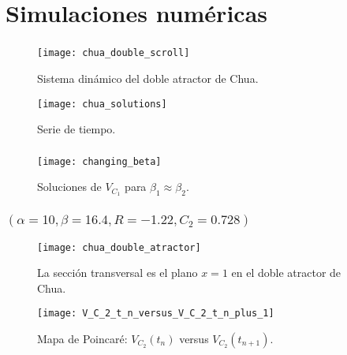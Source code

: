 \section{Simulaciones numéricas}

\begin{frame}
	\frametitle{\secname}

	\begin{minipage}{0.45\textwidth}
		\begin{figure}[ht!]
			\centering
			\texttt{[image: chua\_double\_scroll]}
			\caption{Sistema dinámico del doble atractor de Chua.}\label{fig:chua_double_scroll}
		\end{figure}
	\end{minipage}
	\begin{minipage}{0.45\textwidth}
		\begin{figure}[ht!]
			\centering
			\texttt{[image: chua\_solutions]}
			\caption{Serie de tiempo.}\label{fig:chua_solutions}
		\end{figure}
	\end{minipage}
\end{frame}

\begin{frame}
	\frametitle{\secname} %

	\begin{figure}[ht!]
		\centering
		\texttt{[image: changing\_beta]}
		\caption{Soluciones de $V_{C_{1}}$ para $\beta_{1}\approx\beta_{2}$.}\label{fig:changing_beta}
	\end{figure}

\end{frame}

\begin{frame}
	\frametitle{\secname\quad$\left(\alpha=10,\beta=16.4,R=-1.22,C_{2}=0.728\right)$}

	\begin{minipage}{0.45\textwidth}
		\begin{figure}[ht!]
			\centering
			\texttt{[image: chua\_double\_atractor]}
			\caption{La sección transversal es el plano $x=1$ en el doble atractor de Chua.}\label{fig:chua_doble_atractor}
		\end{figure}
	\end{minipage}
	\begin{minipage}{0.45\textwidth}
		\begin{figure}[ht!]
			\centering
			\texttt{[image: V\_C\_2\_t\_n\_versus\_V\_C\_2\_t\_n\_plus\_1]}
			\caption{Mapa de Poincaré: $V_{C_{2}}\left(t_{n}\right)$ versus $V_{C_{2}}\left(t_{n+1}\right)$.}\label{fig:chua_solutions}
		\end{figure}
	\end{minipage}
\end{frame}

